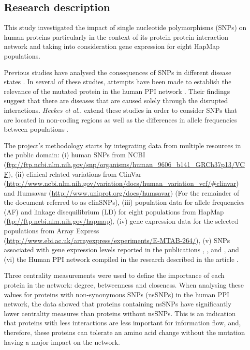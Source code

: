 \subsection{Research description}
This study investigated the impact of single nucleotide polymorphisms (SNPs) on human proteins particularly in the context of its protein-protein interaction network and taking into consideration gene expression for eight HapMap populations.

Previous studies have analysed the consequences of SNPs in different disease states \cite{BAU2009}. In several of these studies, attempts have been made to establish the relevance of the mutated protein in the human PPI network \cite{SAU2011}. Their findings suggest that there are diseases that are caused solely through the disrupted interactions. \emph{Heekes et al.}, extend these studies in order to consider SNPs that are located in non-coding regions as well as the differences in allele frequencies between populations \cite{HEE2014}.

The project's methodology starts by integrating data from multiple resources in the public domain: (i) human SNPs from NCBI (\url{ftp://ftp.ncbi.nlm.nih.gov/snp/organisms/human_9606_b141_GRCh37p13/VCF}), (ii) clinical related variations from ClinVar (\url{http://www.ncbi.nlm.nih.gov/variation/docs/human_variation_vcf/#clinvar}) and Humsavar (\url{http://www.uniprot.org/docs/humsavar})  (For the remainder of the document referred to as clinSNPs), (iii) population data for allele frequencies (AF) and linkage disequilibrium (LD) for eight populations from HapMap (\url{ftp://ftp.ncbi.nlm.nih.gov/hapmap}), (iv) gene expression data for the selected populations from Array Express (\url{http://www.ebi.ac.uk/arrayexpress/experiments/E-MTAB-264/}), (v) SNPs associated with gene expression levels reported in the publications \cite{STR2007}, \cite{LAP2013}, \cite{HAU2014} and \cite{WU2013}, and (vi) the Human PPI network compiled in the research described in the article \cite{RAP2013}.

Three centrality measurements were used to define the importance of each protein in the network: degree, betweenness and closeness. When analysing these values for proteins with non-synonymous SNPs (nsSNPs) in the human PPI network, the data showed that proteins containing nsSNPs have significantly lower centrality measures than proteins without nsSNPs. This is an indication that proteins with less interactions are less important for information flow, and, therefore, these proteins can tolerate an amino acid change without the mutation having a major impact on the network.

